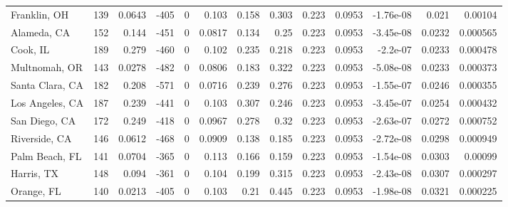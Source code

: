 \documentclass[12pt,letterpaper]{article}
\begin{document}
\begin{sidewaystable}
{\begin{tabular}{lrrrrrrrrrrrr}
 Franklin, OH       & 139   & 0.0643  &  -405 &     0 &          0.103  &            0.158 &         0.303  &        0.223 &       0.0953 &        -1.76e-08 &           0.021   &        0.00104  \\
 Alameda, CA        & 152   & 0.144   &  -451 &     0 &          0.0817 &            0.134 &         0.25   &        0.223 &       0.0953 &        -3.45e-08 &           0.0232  &        0.000565 \\
 Cook, IL           & 189   & 0.279   &  -460 &     0 &          0.102  &            0.235 &         0.218  &        0.223 &       0.0953 &        -2.2e-07  &           0.0233  &        0.000478 \\
 Multnomah, OR      & 143   & 0.0278  &  -482 &     0 &          0.0806 &            0.183 &         0.322  &        0.223 &       0.0953 &        -5.08e-08 &           0.0233  &        0.000373 \\
 Santa Clara, CA    & 182   & 0.208   &  -571 &     0 &          0.0716 &            0.239 &         0.276  &        0.223 &       0.0953 &        -1.55e-07 &           0.0246  &        0.000355 \\
 Los Angeles, CA    & 187   & 0.239   &  -441 &     0 &          0.103  &            0.307 &         0.246  &        0.223 &       0.0953 &        -3.45e-07 &           0.0254  &        0.000432 \\
 San Diego, CA      & 172   & 0.249   &  -418 &     0 &          0.0967 &            0.278 &         0.32   &        0.223 &       0.0953 &        -2.63e-07 &           0.0272  &        0.000752 \\
 Riverside, CA      & 146   & 0.0612  &  -468 &     0 &          0.0909 &            0.138 &         0.185  &        0.223 &       0.0953 &        -2.72e-08 &           0.0298  &        0.000949 \\
 Palm Beach, FL     & 141   & 0.0704  &  -365 &     0 &          0.113  &            0.166 &         0.159  &        0.223 &       0.0953 &        -1.54e-08 &           0.0303  &        0.00099  \\
 Harris, TX         & 148   & 0.094   &  -361 &     0 &          0.104  &            0.199 &         0.315  &        0.223 &       0.0953 &        -2.43e-08 &           0.0307  &        0.000297 \\
 Orange, FL         & 140   & 0.0213  &  -405 &     0 &          0.103  &            0.21  &         0.445  &        0.223 &       0.0953 &        -1.98e-08 &           0.0321  &        0.000225 \\

\end{tabular}}
\end{sidewaystable}
\end{document}

